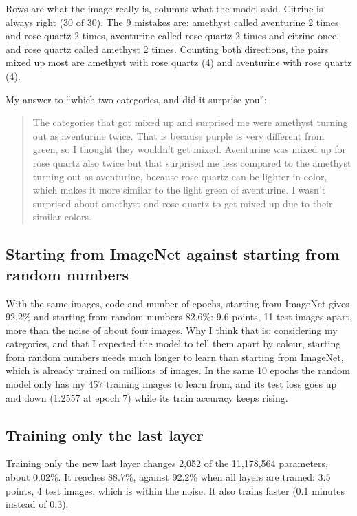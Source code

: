 \documentclass[11pt]{article}
\begin{document}
\begin{center}\end{center}

Rows are what the image really is, columns what the model said. Citrine is
always right (30 of 30). The 9 mistakes are: amethyst called aventurine 2 times
and rose quartz 2 times, aventurine called rose quartz 2 times and citrine once,
and rose quartz called amethyst 2 times. Counting both directions, the pairs
mixed up most are amethyst with rose quartz (4) and aventurine with rose quartz
(4).

My answer to ``which two categories, and did it surprise you'':

\begin{quote}
The categories that got mixed up and surprised me were amethyst turning out as
aventurine twice. That is because purple is very different from green, so I
thought they wouldn't get mixed. Aventurine was mixed up for rose quartz also
twice but that surprised me less compared to the amethyst turning out as
aventurine, because rose quartz can be lighter in color, which makes it more
similar to the light green of aventurine. I wasn't surprised about amethyst and
rose quartz to get mixed up due to their similar colors.
\end{quote}

\subsection*{Starting from ImageNet against starting from random numbers}

With the same images, code and number of epochs, starting from ImageNet gives
92.2\% and starting from random numbers 82.6\%: 9.6 points, 11 test images
apart, more than the noise of about four images. Why I think that is: considering
my categories, and that I expected the model to tell them apart by colour,
starting from random numbers needs much longer to learn than starting from
ImageNet, which is already trained on millions of images. In the same 10 epochs
the random model only has my 457 training images to learn from, and its test
loss goes up and down (1.2557 at epoch 7) while its train accuracy keeps
rising.

\subsection*{Training only the last layer}

Training only the new last layer changes 2,052 of the 11,178,564 parameters, about
0.02\%. It reaches 88.7\%, against 92.2\% when all layers are trained: 3.5 points,
4 test images, which is within the noise. It also trains faster (0.1 minutes
instead of 0.3).
\end{document}
